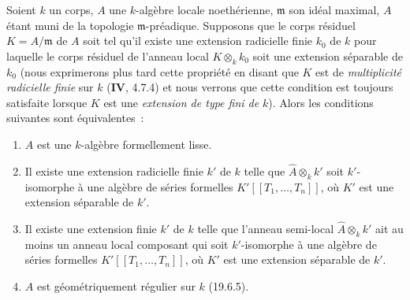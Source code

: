 \begin{proposition}[19.6.6]
\label{0.19.6.6-fr}
Soient $k$ un corps, $A$ une $k$-algèbre locale noethérienne, $\mathfrak m$ son
idéal maximal, $A$ étant muni de la topologie $\mathfrak m$-préadique.
Supposons que le corps résiduel $K=A/\mathfrak m$ de $A$ soit tel qu'il existe
une extension radicielle finie $k_0$ de $k$ pour laquelle le corps résiduel de
l'anneau local $K\otimes_k k_0$ soit une extension séparable de $k_0$ \textup{(nous
exprimerons plus tard cette propriété en disant que $K$ est de
\emph{multiplicité radicielle finie} sur $k$ ($\mathbf{IV}$, 4.7.4) et nous
verrons que cette condition est toujours satisfaite lorsque $K$ est une
\emph{extension de type fini de} $k$)}. Alors les conditions suivantes sont
équivalentes~:
\begin{enumerate}
  \item[\textup{a)}] $A$ est une $k$-algèbre formellement lisse.
  \item[\textup{b)}] Il existe une extension radicielle finie $k'$ de $k$ telle que
  $\widehat A\otimes_k k'$ soit $k'$-isomorphe à une algèbre de séries
  formelles $K'[[T_1,\ldots,T_n]]$, où $K'$ est une extension séparable de
  $k'$.
  \item[\textup{b')}] Il existe une extension finie $k'$ de $k$ telle que l'anneau
  semi-local $\widehat A\otimes_k k'$ ait \textup{au moins un} anneau local composant
  qui soit $k'$-isomorphe à une algèbre de séries formelles
  $K'[[T_1,\ldots,T_n]]$, où $K'$ est une extension séparable de $k'$.
  \item[\textup{c)}] $A$ est géométriquement régulier sur $k$ \textup{(19.6.5)}.
\end{enumerate}
\end{proposition}

